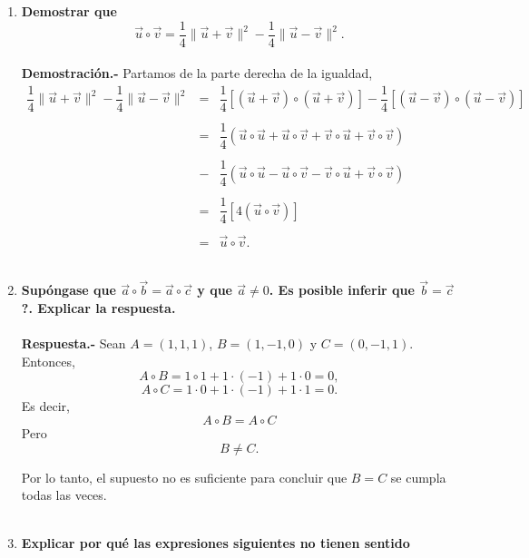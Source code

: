 \begin{enumerate}
\item \textbf{\boldmath Demostrar que 
    $$\vec{u}\circ \vec{v} = \dfrac{1}{4} \|\vec{u}+\vec{v}\|^2 - \dfrac{1}{4} \|\vec{u}-\vec{v}\|^2.$$\\
    Demostración.-}\; Partamos de la parte derecha de la igualdad,
    $$\begin{array}{rcl}
	\dfrac{1}{4} \|\vec{u}+\vec{v}\|^2 - \dfrac{1}{4} \|\vec{u}-\vec{v}\|^2&=&\dfrac{1}{4}\left[(\vec{u}+\vec{v})\circ(\vec{u}+\vec{v})\right]-\dfrac{1}{4}\left[(\vec{u}-\vec{v})\circ(\vec{u}-\vec{v})\right]\\\\
									       &=&\dfrac{1}{4}\left(\vec{u}\circ \vec{u}+\vec{u}\circ \vec{v}+\vec{v}\circ \vec{u}+\vec{v}\circ\vec{v}\right)\\\\
									       &-&\dfrac{1}{4}\left(\vec{u}\circ \vec{u}-\vec{u}\circ \vec{v}-\vec{v}\circ \vec{u}+\vec{v}\circ\vec{v}\right)\\\\
									       &=&\dfrac{1}{4}\left[4\left(\vec{u}\circ\vec{v}\right)\right]\\\\
									       &=&\vec{u}\circ \vec{v}.
    \end{array}$$
    \vspace{.4cm}\\


\item \textbf{\boldmath Supóngase que $\vec{a}\circ \vec{b} = \vec{a}\circ \vec{c}$ y que $\vec{a}\neq 0$. Es posible inferir que $\vec{b}=\vec{c}$?. Explicar la respuesta.\\\\
    Respuesta.-}\; Sean $A=(1,1,1)$, $B=(1,-1,0)$ y $C=(0,-1,1)$. Entonces, $$A\circ B = 1\circ 1 + 1\cdot(-1)+1\cdot 0 = 0,$$ 
    $$A\circ C = 1\cdot 0 + 1\cdot(-1)+1\cdot 1 = 0.$$
    Es decir, 
    $$A\circ B = A\circ C$$
    Pero $$B\neq C.$$

    Por lo tanto, el supuesto no es suficiente para concluir que $B=C$ se cumpla todas las veces.\\\\ 

\item \textbf{\boldmath Explicar por qué las expresiones siguientes no tienen sentido}

    \begin{enumerate}[a)]


\end{enumerate}
\end{enumerate}
